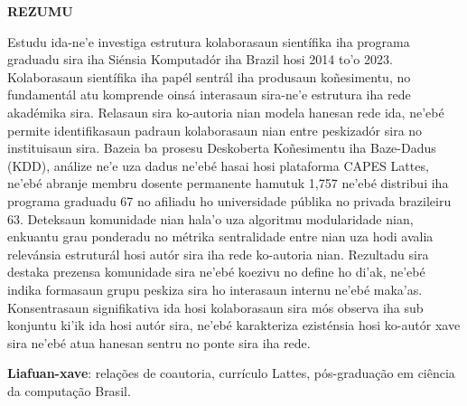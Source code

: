 \cleardoublepage
\begin{titlepage}
\centering
\textbf{\large REZUMU} %
\vspace{1cm}


\justifying
Estudu ida-ne'e investiga estrutura kolaborasaun sientífika iha programa graduadu sira iha Siénsia Komputadór iha Brazil hosi 2014 to'o 2023. Kolaborasaun sientífika iha papél sentrál iha produsaun koñesimentu, no fundamentál atu komprende oinsá interasaun sira-ne'e estrutura iha rede akadémika sira. Relasaun sira ko-autoria nian modela hanesan rede ida, ne'ebé permite identifikasaun padraun kolaborasaun nian entre peskizadór sira no instituisaun sira. Bazeia ba prosesu Deskoberta Koñesimentu iha Baze-Dadus (KDD), análize ne'e uza dadus ne'ebé hasai hosi plataforma CAPES Lattes, ne'ebé abranje membru dosente permanente hamutuk 1,757 ne'ebé distribui iha programa graduadu 67 no afiliadu ho universidade públika no privada brazileiru 63. Deteksaun komunidade nian hala'o uza algoritmu modularidade nian, enkuantu grau ponderadu no métrika sentralidade entre nian uza hodi avalia relevánsia estruturál hosi autór sira iha rede ko-autoria nian. Rezultadu sira destaka prezensa komunidade sira ne'ebé koezivu no define ho di'ak, ne'ebé indika formasaun grupu peskiza sira ho interasaun internu ne'ebé maka'as. Konsentrasaun signifikativa ida hosi kolaborasaun sira mós observa iha sub konjuntu ki'ik ida hosi autór sira, ne'ebé karakteriza ezisténsia hosi ko-autór xave sira ne'ebé atua hanesan sentru no ponte sira iha rede.

\vspace{0.5cm}
\textbf{Liafuan-xave}: rela\c{c}\~{o}es de coautoria, curr\'{i}culo Lattes, p\'{o}s-gradua\c{c}\~{a}o em ci\^{e}ncia da computa\c{c}\~{a}o Brasil.
 
\end{titlepage}



